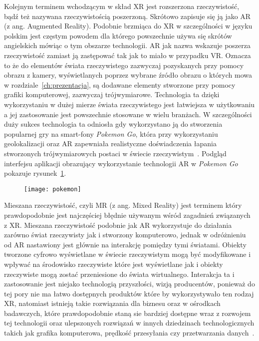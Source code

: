 	Kolejnym terminem wchodzącym w skład XR jest rozszerzona rzeczywistość, bądź też nazywana rzeczywistością poszerzoną. Skrótowo zapisuje się ją jako AR (z ang. Augmented Reality). Podobnie brzmiąca do XR w szczególności w języku polskim jest częstym powodem dla którego powszechnie używa się skrótów angielskich mówiąc o tym obszarze technologii. AR jak nazwa wskazuje poszerza rzeczywistość zamiast ją zastępować tak jak to miało w przypadku VR. Oznacza to że do elementów świata rzeczywistego zazwyczaj pozyskanych przy pomocy obrazu z kamery, wyświetlanych poprzez wybrane źródło obrazu o których mowa w rozdziale~\ref{ch:prezentacja}, są dodawane elementy stworzone przy pomocy grafiki komputerowej, zazwyczaj trójwymiarowe. Technologia ta dzięki wykorzystaniu w dużej mierze świata rzeczywistego jest łatwiejsza w użytkowaniu a jej zastosowanie jest powszechnie stosowane w wielu branżach. W szczególności duży sukces technologia ta odniosła gdy wykorzystano ją do stworzenia popularnej gry na smart-fony \textit{Pokemon Go}, która przy wykorzystaniu geolokalizacji oraz AR zapewniała realistyczne doświadczenia łapania stworzonych trójwymiarowych postaci w świecie rzeczywistym~\cite{terms}. Podgląd interfejsu aplikacji obrazujący wykorzystanie technologii AR  w \textit{Pokemon Go} pokazuje rysunek~\ref{fig:pokemon}.
	
\begin{figure}[h]
\centering
\texttt{[image: pokemon]}
\label{fig:pokemon}
\end{figure}

	
	Mieszana rzeczywistość, czyli MR (z ang. Mixed Reality) jest terminem który prawdopodobnie jest najczęściej błędnie używanym wśród zagadnień związanych z XR. Mieszana rzeczywistość podobnie jak AR wykorzystuje do działania zarówno świat rzeczywisty jak i stworzony komputerowo, jednak w odróżnieniu od AR nastawiony jest głównie na interakcję pomiędzy tymi światami. Obiekty tworzone cyfrowo wyświetlane w świecie rzeczywistym mogą być modyfikowane i wpływać na środowisko rzeczywiste które jest wyświetlane jak i obiekty rzeczywiste mogą zostać przeniesione do świata wirtualnego. Interakcja ta i zastosowanie jest niejako technologią przyszłości, wizją producentów, ponieważ do tej pory nie ma łatwo dostępnych produktów które by wykorzystywało ten rodzaj XR, natomiast istnieją takie rozwiązania dla biznesu oraz w ośrodkach badawczych, które prawdopodobnie staną sie bardziej dostępne wraz z rozwojem tej technologii oraz ulepszonych rozwiązań w innych dziedzinach technologicznych takich jak grafika komputerowa, prędkość przesyłania czy przetwarzania danych~\cite{terms}.


